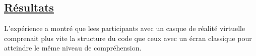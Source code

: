 \documentclass[a4paper,10pt, oneside]{article}
\begin{document}
\subsection{\ul{Résultats}}
		\par L'expérience a montré que lees participants avec un casque de réalité virtuelle comprenait plus vite la structure du code que ceux avec un écran classique pour atteindre le même niveau de compréhension.
\newpage

 
\end{document}
